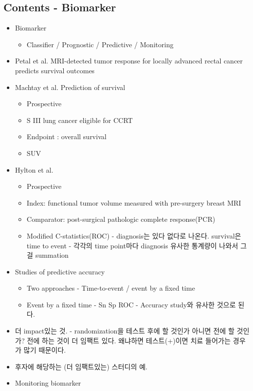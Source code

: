 \documentclass[]{book}
\providecommand{\tightlist}{%
  \setlength{\itemsep}{0pt}\setlength{\parskip}{0pt}}
\begin{document}
\subsection{Contents - Biomarker}\label{contents---biomarker}

\begin{itemize}
\tightlist
\item
  Biomarker

  \begin{itemize}
  \tightlist
  \item
    Classifier / Prognostic / Predictive / Monitoring
  \end{itemize}
\item
  Petal et al. MRI-detected tumor response for locally advanced rectal
  cancer predicts survival outcomes
\item
  Machtay et al. Prediction of survival

  \begin{itemize}
  \tightlist
  \item
    Prospective
  \item
    S III lung cancer eligible for CCRT
  \item
    Endpoint : overall survival
  \item
    SUV
  \end{itemize}
\item
  Hylton et al.

  \begin{itemize}
  \tightlist
  \item
    Prospective
  \item
    Index: functional tumor volume measured with pre-surgery breast MRI
  \item
    Comparator: post-surgical pathologic complete response(PCR)
  \item
    Modified C-statistics(ROC) - diagnosis는 있다 없다로 나온다.
    survival은 time to event - 각각의 time point마다 diagnosis 유사한
    통계량이 나와서 그걸 summation
  \end{itemize}
\item
  Studies of predictive accuracy

  \begin{itemize}
  \tightlist
  \item
    Two approaches - Time-to-event / event by a fixed time
  \item
    Event by a fixed time - Sn Sp ROC - Accuracy study와 유사한 것으로
    된다.
  \end{itemize}
\item
  더 impact있는 것. - randomization을 테스트 후에 할 것인가 아니면 전에
  할 것인가? 전에 하는 것이 더 임팩트 있다. 왜냐하면 테스트(+)이면 치료
  들어가는 경우가 많기 때문이다.
\item
  후자에 해당하는 (더 임팩트있는) 스터디의 예.
\item
  Monitoring biomarker


\end{itemize}
\end{document}
